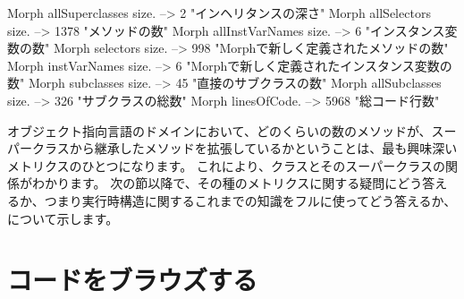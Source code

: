 \documentclass[a4paper,10pt,twoside]{book}
\begin{document}
\begin{code}{}
Morph allSuperclasses size.  -->       2 "インヘリタンスの深さ"
Morph allSelectors size.        --> 1378 "メソッドの数"
Morph allInstVarNames size. -->      6 "インスタンス変数の数"
Morph selectors size.             -->  998 "Morphで新しく定義されたメソッドの数"
Morph instVarNames size.     -->      6 "Morphで新しく定義されたインスタンス変数の数"
Morph subclasses size.          -->    45 "直接のサブクラスの数"
Morph allSubclasses size.      -->  326 "サブクラスの総数"
Morph linesOfCode.               --> 5968 "総コード行数"
\end{code}

オブジェクト指向言語のドメインにおいて、どのくらいの数のメソッドが、スーパークラスから継承したメソッドを拡張しているかということは、最も興味深いメトリクスのひとつになります。
これにより、クラスとそのスーパークラスの関係がわかります。
次の節以降で、その種のメトリクスに関する疑問にどう答えるか、つまり実行時構造に関するこれまでの知識をフルに使ってどう答えるか、について示します。%

\section{コードをブラウズする}
\end{document}
